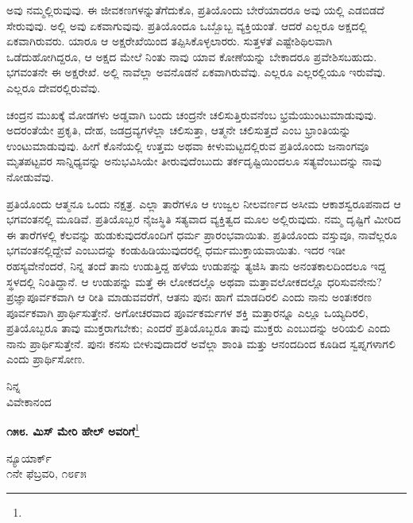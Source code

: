 \noindent
ಅವು ನಮ್ಮಲ್ಲಿರುವುವು.  ಈ ಜೀವಕಣಗಳನ್ನು\break ತೆಗೆದುಕೊ, ಪ್ರತಿಯೊಂದು ಬೇರೆಯಾದರೂ ಅವು  ಯಲ್ಲಿ ಎಡಬಿಡದೆ ಸೇರುವುವು. ಅಲ್ಲಿ ಅವು ಏಕವಾಗುವುವು. ಪ್ರತಿಯೊಂದೂ ಒಬ್ಬೊಬ್ಬ ವ್ಯಕ್ತಿಯಂತೆ. ಆದರೆ ಎಲ್ಲರೂ  ಅಕ್ಷದಲ್ಲಿ ಏಕವಾಗಿರುವರು. ಯಾರೂ ಆ ಅಕ್ಷರೇಖೆಯಿಂದ ತಪ್ಪಿಸಿಕೊಳ್ಳಲಾರರು. ಸುತ್ತಳತೆ ಎಷ್ಟೇಶಿಥಿಲವಾಗಿ ಒಡೆದುಹೋಗಿದ್ದರೂ, ಆ ಅಕ್ಷದ ಮೇಲೆ ನಿಂತು ನಾವು ಯಾವ ಕೋಣೆಯನ್ನು ಬೇಕಾದರೂ ಪ್ರವೇಶಿಸಬಹುದು. ಭಗವಂತನೇ ಈ ಅಕ್ಷರೇಖೆ. ಅಲ್ಲಿ ನಾವೆಲ್ಲಾ ಅವನೊಡನೆ ಏಕವಾಗಿರುವೆವು. ಎಲ್ಲರೂ ಎಲ್ಲರಲ್ಲಿಯೂ ಇರುವೆವು. ಎಲ್ಲರೂ ದೇವರಲ್ಲಿರುವೆವು.


ಚಂದ್ರನ ಮುಖಕ್ಕೆ ಮೋಡಗಳು ಅಡ್ಡವಾಗಿ ಬಂದು ಚಂದ್ರನೇ ಚಲಿಸುತ್ತಿರುವನೆಂಬ ಭ್ರಮೆಯುಂಟುಮಾಡುವುವು. ಅದರಂತೆಯೇ ಪ್ರಕೃತಿ, ದೇಹ, ಜಡದ್ರವ್ಯಗಳೆಲ್ಲಾ ಚಲಿಸುತ್ತಾ, ಆತ್ಮನೇ ಚಲಿಸುತ್ತದೆ ಎಂಬ ಭ್ರಾಂತಿಯನ್ನು ಉಂಟುಮಾಡುವುವು. ಹೀಗೆ ಕೊನೆಯಲ್ಲಿ ಉತ್ತಮ ಅಥವಾ ಕೀಳುಮಟ್ಟದಲ್ಲಿರುವ ಪ್ರತಿಯೊಂದು ಜನಾಂಗವೂ ಮೃತಪಟ್ಟವರ ಸಾನ್ನಿಧ್ಯವನ್ನು ಅನುಭವಿಸಿಯೇ ತೀರುವುದೆಂಬುದು ತರ್ಕದೃಷ್ಟಿಯಿಂದಲೂ ಸತ್ಯವೆಂಬುದನ್ನು ನಾವು ನೋಡುವೆವು.

ಪ್ರತಿಯೊಂದು ಆತ್ಮನೂ ಒಂದು ನಕ್ಷತ್ರ. ಎಲ್ಲಾ ತಾರೆಗಳೂ ಆ ಉಜ್ವಲ ನೀಲವರ್ಣದ ಅಸೀಮ ಆಕಾಶಸ್ವರೂಪನಾದ ಆ ಭಗವಂತನಲ್ಲಿ ಮೂಡಿವೆ. ಪ್ರತಿಯೊಬ್ಬರ ನೈಜಸ್ಥಿತಿ ಸತ್ಯವಾದ ವ್ಯಕ್ತಿತ್ವದ ಮೂಲ ಅಲ್ಲಿರುವುದು. ನಮ್ಮ ದೃಷ್ಟಿಗೆ ಮೀರಿದ ಈ ತಾರೆಗಳಲ್ಲಿ ಕೆಲವನ್ನು ಹುಡುಕುವುದರೊಂದಿಗೆ ಧರ್ಮ ಪ್ರಾರಂಭವಾಯಿತು. ಪ್ರತಿಯೊಂದು ವಸ್ತುವೂ, ನಾವೆಲ್ಲರೂ ಭಗವಂತನಲ್ಲಿದ್ದೇವೆ ಎಂಬುದನ್ನು ಕಂಡುಹಿಡಿಯುವುದರಲ್ಲಿ ಧರ್ಮ\break ಮುಕ್ತಾಯವಾಯಿತು. ಇದರ ಇಡೀ ರಹಸ್ಯವೇನೆಂದರೆ, ನಿನ್ನ ತಂದೆ ತಾನು ಉಡುತ್ತಿದ್ದ ಹಳೆಯ ಉಡುಪನ್ನು ತ್ಯಜಿಸಿ ತಾನು ಅನಂತಕಾಲದಿಂದಲೂ ಇದ್ದ ಸ್ಥಳದಲ್ಲಿ ನಿಂತಿದ್ದಾನೆ. ಆ ಉಡುಪನ್ನು ಮತ್ತೆ ಈ ಲೋಕದಲ್ಲೊ ಅಥವಾ ಮತ್ತಾವಲೋಕದಲ್ಲೊ ಧರಿಸುವನೇನು? ಪ್ರಜ್ಞಾಪೂರ್ವಕವಾಗಿ ಆ ರೀತಿ ಮಾಡುವವರೆಗೆ, ಆತನು ಪುನಃ ಹಾಗೆ ಮಾಡದಿರಲಿ ಎಂದು ನಾನು ಅಂತಃಕರಣ ಪೂರ್ವಕವಾಗಿ ಪ್ರಾರ್ಥಿಸುತ್ತೇನೆ. ಅಗೋಚರವಾದ ಪೂರ್ವಕರ್ಮಗಳ ಶಕ್ತಿ ಮತ್ತಾರನ್ನೂ ಎಲ್ಲೂ ಒಯ್ಯದಿರಲಿ, ಪ್ರತಿಯೊಬ್ಬರೂ ತಾವು ಮುಕ್ತರಾಗಬೇಕು; ಎಂದರೆ ಪ್ರತಿಯೊಬ್ಬರೂ ತಾವು ಮುಕ್ತರು ಎಂಬುದನ್ನು ಅರಿಯಲಿ ಎಂದು ನಾನು ಪ್ರಾರ್ಥಿಸುತ್ತೇನೆ. ಪುನಃ ಕನಸು ಬೀಳುವುದಾದರೆ ಅವೆಲ್ಲಾ ಶಾಂತಿ ಮತ್ತು ಆನಂದದಿಂದ ಕೂಡಿದ ಸ್ವಪ್ನಗಳಾಗಲಿ ಎಂದು ಪ್ರಾರ್ಥಿಸೋಣ.

\vspace{-0.3cm}

{\flushright
ನಿನ್ನ\\ವಿವೇಕಾನಂದ\par}

\begin{center}
\textbf{೧೫೮. ಮಿಸ್ ಮೇರಿ ಹೇಲ್‌ ಅವರಿಗೆ}\footnote{}
\end{center}

\vspace{-0.8cm}

\begin{flushright}
ನ್ಯೂಯಾರ್ಕ್\\೧ನೇ ಫೆಬ್ರವರಿ, ೧೮೯೫
\end{flushright}

